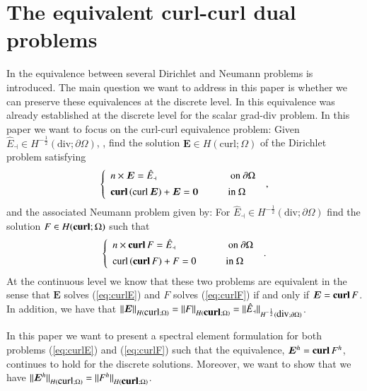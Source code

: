 \documentclass[graybox]{svmult}
\begin{document}
\section{The equivalent curl-curl dual problems}\label{sec:curl_curl_problem}
In \cite{Carstensen} the equivalence between several Dirichlet and Neumann problems is introduced. The main question we want to address in this paper is whether we can preserve these equivalences at the discrete level. In \cite{Jain} this equivalence was already established at the discrete level for the scalar grad-div problem. In this paper we want to focus on the curl-curl equivalence problem: Given $\hat{E}_{\dashv} \in H^{-\frac{1}{2}}(\mbox{div};\partial \Omega)$, \cite{BuffaCiarlet}, find the solution $\bm{E} \in H(\mbox{curl};\Omega)$ of the Dirichlet problem satisfying
\begin{equation}
\left \{ \begin{array}{ll}
n \times \bm{E} = \hat{E}_{\dashv} \quad \quad &\mbox{ on } \partial \Omega \\[1ex]
\mbox{\bf{curl}} \left ( \mbox{curl}\, \bm{E} \right ) + \bm{E} = \bm{0} \quad \quad &\mbox{in } \Omega
\end{array} \right . \; ,
\label{eq:curlE}
\end{equation}
and the associated Neumann problem given by: For $\hat{E}_{\dashv} \in H^{-\frac{1}{2}}(\mbox{div};\partial \Omega)$ find the solution $F \in H(\mbox{\bf{curl}};\Omega)$ such that
\begin{equation}
\left \{ \begin{array}{ll}
n \times \mbox{\bf{curl}}\,F = \hat{E}_{\dashv} \quad \quad &\mbox{ on } \partial \Omega \\[1ex]
\mbox{curl} \left ( \mbox{\bf{curl}} \,F \right ) + F = 0 \quad \quad &\mbox{in } \Omega
\end{array} \right . \; .
\label{eq:curlF}
\end{equation}
At the continuous level we know that these two problems are equivalent in the sense that $\bm{E}$ solves (\ref{eq:curlE}) and $F$ solves (\ref{eq:curlF}) if and only if $\bm{E}=\mbox{\bf{curl}}\,F$. In addition, we have that $\|\bm{E}\|_{H(\mbox{curl};\Omega)}=\|F\|_{H(\mbox{\bf{curl}};\Omega)} = \| \hat{E}_{\dashv} \|_{H^{-\frac{1}{2}}(\mbox{div};\partial \Omega)}$.

In this paper we want to present a spectral element formulation for both problems (\ref{eq:curlE}) and (\ref{eq:curlF}) such that the equivalence, $\bm{E}^h=\mbox{\bf{curl}}\,F^h$, continues to hold for the discrete solutions. Moreover, we want to show that we have $\|\bm{E}^h\|_{H(\mbox{curl};\Omega)}=\|F^h\|_{H(\mbox{\bf{curl}};\Omega)}$.
\end{document}
